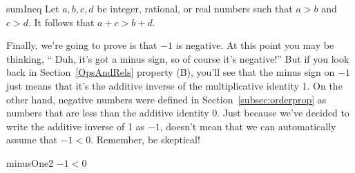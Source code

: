 \begin{prop}{sumIneq}
Let $a,b,c,d$ be integer, rational, or real numbers such that $a>b$ and $c>d$.  It follows that  $a+c > b+d$.
\end{prop}

%
%


Finally, we're going to prove is that $-1$ is negative.  At this point you may be thinking, `` Duh,  it's got a minus sign, so of course it's negative!'' But if you look back in Section~\ref{OpsAndRels} property (B), you'll see that the minus sign on $-1$ just means that it's the additive inverse of the multiplicative identity 1. On the other hand, negative numbers were defined in  Section~\ref{subsec:orderprop} as numbers that are less than the additive identity 0.  Just because we've decided to write the additive inverse of 1 as $-1$, doesn't mean that we can automatically assume that $-1<0$.  Remember, be skeptical!

\begin{prop}{minusOne2}
$-1 < 0$
\end{prop}

